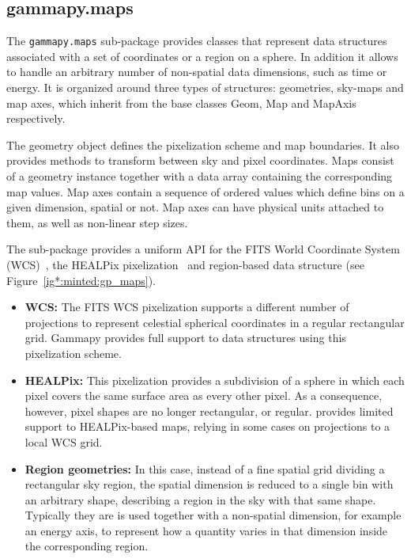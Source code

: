 \subsection{gammapy.maps}
\label{ssec:gammapy-maps}
The \verb|gammapy.maps| sub-package provides classes that represent data
structures associated with a set of coordinates or a region on a sphere. In
addition it allows to handle an arbitrary number of non-spatial data
dimensions, such as time or energy. It is organized around three types of
structures: geometries, sky-maps and map axes, which inherit from the base
classes Geom, Map and MapAxis respectively.

The geometry object defines the pixelization scheme and map boundaries. It also
provides methods to transform between sky and pixel coordinates. Maps consist
of a geometry instance together with a data array containing the corresponding
map values. Map axes contain a sequence of ordered values which define bins on
a given dimension, spatial or not. Map axes can have physical units attached to
them, as well as non-linear step sizes.

The sub-package provides a uniform API for the FITS World Coordinate System
(WCS)~\citep{Calabretta2002}, the HEALPix pixelization~\citep{Gorski2005} and
region-based data structure (see Figure~\ref{ig*:minted:gp_maps}).

\begin{itemize}
	\item \textbf{WCS: } The FITS WCS pixelization supports a different
	      number of projections to represent celestial spherical coordinates in a regular
	      rectangular grid. Gammapy provides full support to data structures using this
	      pixelization scheme.
	 \item \textbf{HEALPix: } This pixelization provides a
	      subdivision of a sphere in which each pixel covers the same surface area as
	      every other pixel. As a consequence, however, pixel shapes are no longer
	      rectangular, or regular. \gammapy provides limited support to HEALPix-based
	      maps, relying in some cases on projections to a local WCS grid. 
   \item \textbf{Region geometries: } In this case, instead of a fine spatial grid
	      dividing a rectangular sky region, the spatial dimension is reduced to a single
	      bin with an arbitrary shape, describing a region in the sky with that same
	      shape. Typically they are is used together with a non-spatial dimension, for
	      example an energy axis, to represent how a quantity varies in that dimension
	      inside the corresponding region. \end{itemize}

